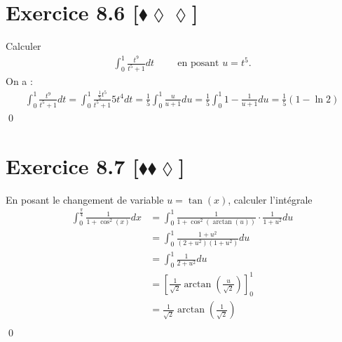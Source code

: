 \documentclass[10pt]{article}
\begin{document}
\section*{Exercice 8.6 [$\blacklozenge\lozenge\lozenge$]}
\begin{tcolorbox}[enhanced, width=7in, center, size=fbox, fontupper=\large, drop shadow southwest]
    Calculer
    \begin{align*}
        \int_0^1{\frac{t^9}{t^5+1}dt} \hspace{1cm} \text{en posant } u=t^5.
    \end{align*}
    On a :
    \begin{align*}
        \int_0^1{\frac{t^9}{t^5+1}dt}=\int_0^1{\frac{\frac{1}{5}t^5}{t^5+1}5t^4dt}=\frac{1}{5}\int^1_0{\frac{u}{u+1}du}=\frac{1}{5}\int^1_0{1-\frac{1}{u+1}du}=\frac{1}{5}\left(1-\ln2\right)
    \end{align*}
    \qed
\end{tcolorbox}


\section*{Exercice 8.7 [$\blacklozenge\blacklozenge\lozenge$]}
\begin{tcolorbox}[enhanced, width=7in, center, size=fbox, fontupper=\large, drop shadow southwest]
    En posant le changement de variable $u=\tan(x)$, calculer l'intégrale
    \begin{align*}
        \int_0^{\frac{\pi}{4}}{\frac{1}{1+\cos^2(x)}dx}&=\int_0^1{\frac{1}{1+\cos^2(\arctan(u))}\cdot\frac{1}{1+u^2}du}\\
        &=\int_0^1{\frac{1+u^2}{(2+u^2)(1+u^2)}du}\\
        &=\int_0^1{\frac{1}{2+u^2}du}\\
        &=\left[\frac{1}{\sqrt{2}}\arctan\left(\frac{u}{\sqrt{2}}\right)\right]_0^1\\
        &=\frac{1}{\sqrt{2}}\arctan\left(\frac{1}{\sqrt{2}}\right)\\
    \end{align*}
    \qed
\end{tcolorbox}

\end{document}
